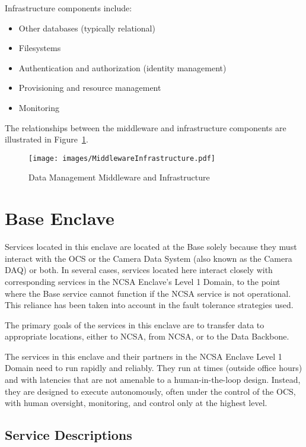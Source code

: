 \documentclass[DM,toc]{lsstdoc}
\begin{document}
Infrastructure components include:
\begin{itemize}
\item
  Other databases (typically relational)
\item
  Filesystems
\item
  Authentication and authorization (identity management)
\item
  Provisioning and resource management
\item
  Monitoring
\end{itemize}

The relationships between the middleware and infrastructure components
are illustrated in Figure~\ref{fig:mwandinfra}.

\begin{figure}
\centering
\texttt{[image: images/MiddlewareInfrastructure.pdf]}
\caption{Data Management Middleware and Infrastructure}
\label{fig:mwandinfra}
\end{figure}

\section{Base Enclave}\label{base-enclave}

Services located in this enclave are located at the Base solely because
they must interact with the OCS or the Camera Data System (also known as
the Camera DAQ) or both. In several cases, services located here
interact closely with corresponding services in the NCSA Enclave's Level
1 Domain, to the point where the Base service cannot function if the
NCSA service is not operational. This reliance has been taken into
account in the fault tolerance strategies used.

The primary goals of the services in this enclave are to transfer data
to appropriate locations, either to NCSA, from NCSA, or to the Data
Backbone.

The services in this enclave and their partners in the NCSA Enclave
Level 1 Domain need to run rapidly and reliably. They run at times
(outside office hours) and with latencies that are not amenable to a
human-in-the-loop design. Instead, they are designed to execute
autonomously, often under the control of the OCS, with human oversight,
monitoring, and control only at the highest level.

\subsection{Service Descriptions}\label{base-service-descriptions}
\end{document}
